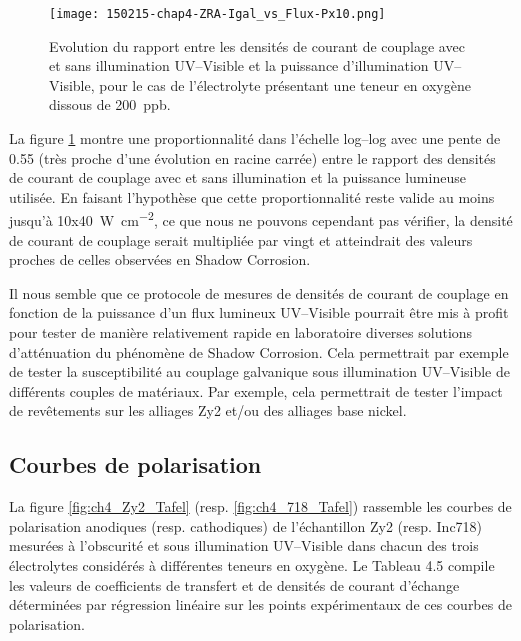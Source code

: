 \begin{refsection}
    \begin{figure}[H]
        \centering
        \texttt{[image: 150215-chap4-ZRA-Igal\_vs\_Flux-Px10.png]}
        \caption{Evolution du rapport entre les densités de courant de couplage avec et sans illumination UV--Visible et
        la puissance d’illumination UV--Visible, pour le cas de l’électrolyte présentant une teneur en oxygène dissous de
    200~ppb.}
        \label{fig:ch4_Iph_vs_Power}
    \end{figure}

    La figure \ref{fig:ch4_Iph_vs_Power} montre une proportionnalité dans l’échelle log--log avec une pente de 0.55 (très proche d’une
    évolution en racine carrée) entre le rapport des densités de courant de couplage avec et sans illumination et la
    puissance lumineuse utilisée. En faisant l’hypothèse que cette proportionnalité reste valide au moins jusqu’à
    10x\SI{40}{\watt\per\square\centi\meter},
    ce que nous ne pouvons cependant pas vérifier, la densité de courant de couplage serait multipliée par vingt
    et atteindrait des valeurs proches de celles observées en Shadow Corrosion.

    Il nous semble que ce protocole de mesures de densités de courant de couplage en fonction de la puissance d’un flux
    lumineux UV--Visible pourrait être mis à profit pour tester de manière relativement rapide en laboratoire diverses
    solutions d’atténuation du phénomène de Shadow Corrosion. Cela permettrait par exemple de tester la susceptibilité
    au couplage galvanique sous illumination UV--Visible de différents couples de matériaux. Par exemple, cela
    permettrait de tester l’impact de revêtements sur les alliages Zy2 et/ou des alliages base nickel.




    \subsection{Courbes de polarisation}\label{subsec:ch4_oxygen_Tafel}

    La figure \ref{fig:ch4_Zy2_Tafel} (resp. \ref{fig:ch4_718_Tafel}) rassemble les courbes de polarisation anodiques
    (resp. cathodiques) de
    l’échantillon Zy2 (resp. Inc718) mesurées à l’obscurité et sous illumination UV--Visible dans chacun des trois
    électrolytes considérés à différentes teneurs en oxygène. Le Tableau 4.5 compile les valeurs de coefficients de
    transfert et de densités de courant d’échange déterminées par régression linéaire sur les points expérimentaux de
    ces courbes de polarisation.


\end{refsection}
